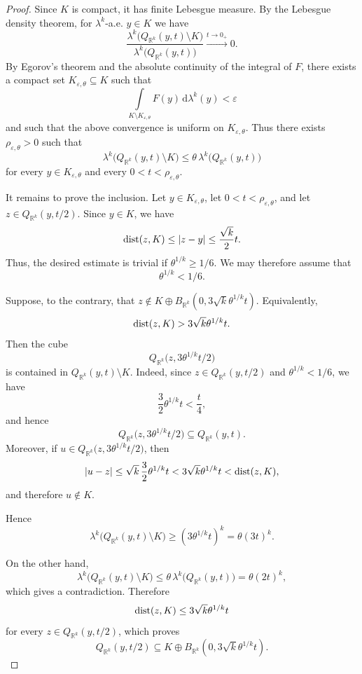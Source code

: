 \documentclass[10pt,a4paper]{amsart}
\DeclareMathOperator{\dist}{\textup{dist}}
\newcommand{\dlambda}[1]{\,\mathrm d\lambda^{#1}}
\begin{document}
\begin{proof}
Since $K$ is compact, it has finite Lebesgue measure. By the Lebesgue density
theorem, for $\lambda^k$-a.e. $y\in K$ we have
\[
\frac{\lambda^k\big(Q_{\mathbb{R}^k}(y, t)\setminus K\big)}{\lambda^k\big(Q_{\mathbb{R}^k}(y, t)\big)}\xrightarrow{t\to0_+}0.
\]
By Egorov's theorem and the absolute continuity of the integral of $F$, there
exists a compact set $K_{\varepsilon, \theta}\subseteq K$ such that
\[
\int\limits_{K\setminus K_{\varepsilon, \theta}}F(y)\dlambda{k}(y)<\varepsilon
\]
and such that the above convergence is uniform on $K_{\varepsilon, \theta}$.
Thus there exists $\rho_{\varepsilon, \theta}>0$ such that
\[
\lambda^k\big(Q_{\mathbb{R}^k}(y, t)\setminus K\big)\leq \theta\,\lambda^k\big(Q_{\mathbb{R}^k}(y, t)\big)
\]
for every $y\in K_{\varepsilon, \theta}$ and every
$0<t<\rho_{\varepsilon, \theta}$.

It remains to prove the inclusion. Let $y\in K_{\varepsilon, \theta}$,
let $0<t<\rho_{\varepsilon, \theta}$, and let $z\in Q_{\mathbb{R}^k}(y, t/2)$. Since
$y\in K$, we have
\[
\dist(z, K)\leq |z-y|\leq \frac{\sqrt{k}}{2}t.
\]
Thus, the desired estimate is trivial if
$\theta^{1/k}\geq 1/6$. We may therefore assume that
$$\theta^{1/k}<1/6.$$

Suppose, to the contrary, that $z\notin K\oplus B_{\mathbb{R}^k}(0, 3\sqrt{k}\theta^{1/k}t).$ Equivalently,
\[
\dist(z, K)>3\sqrt{k}\theta^{1/k}t.
\]
Then the cube
\[
Q_{\mathbb{R}^k}\big(z, 3\theta^{1/k}t/2\big)
\]
is contained in $Q_{\mathbb{R}^k}(y, t)\setminus K$. Indeed, since $z\in Q_{\mathbb{R}^k}(y,t/2)$ and $\theta^{1/k}<1/6$, we have \[ \frac{3}{2}\theta^{1/k}t<\frac{t}{4}, \] and hence \[ Q_{\mathbb{R}^k}\big(z,3\theta^{1/k}t/2\big)\subseteq Q_{\mathbb{R}^k}(y,t). \] Moreover, if $u\in Q_{\mathbb{R}^k}\big(z,3\theta^{1/k}t/2\big)$, then \[ |u-z|\leq \sqrt{k}\,\frac{3}{2}\theta^{1/k}t <3\sqrt{k}\theta^{1/k}t<\dist(z,K), \] and therefore $u\notin K$.


Hence
\[
\lambda^k\big(Q_{\mathbb{R}^k}(y, t)\setminus K\big)
\geq
(3\theta^{1/k}t)^k=\theta (3t)^k.
\]


On the other hand,
\[
\lambda^k\big(Q_{\mathbb{R}^k}(y, t)\setminus K\big)
\leq
\theta\,\lambda^k\big(Q_{\mathbb{R}^k}(y, t)\big)
=
\theta(2t)^k,
\]
which gives a contradiction. Therefore
\[
\dist(z, K)\leq 3\sqrt{k}\theta^{1/k}t
\]
for every $z\in Q_{\mathbb{R}^k}(y, t/2)$, which proves
\[
Q_{\mathbb{R}^k}(y, t/2)\subseteq K\oplus B_{\mathbb R^k}(0, 3\sqrt{k}\theta^{1/k}t).
\]
\end{proof}
\end{document}

